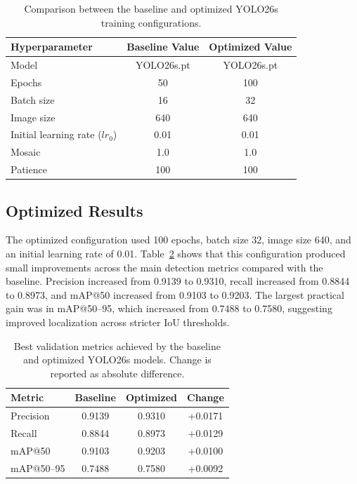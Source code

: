 \documentclass[10pt,twocolumn,letterpaper]{article}
\begin{document}
\begin{table}[!htbp]
  \centering
  \begin{tabular}{@{}lcc@{}}
    \toprule
    Hyperparameter & Baseline Value & Optimized Value \\
    \midrule
    Model & YOLO26s.pt & YOLO26s.pt \\
    Epochs & 50 & 100 \\
    Batch size & 16 & 32 \\
    Image size & 640 & 640 \\
    Initial learning rate ($lr_0$) & 0.01 & 0.01 \\
    Mosaic & 1.0 & 1.0 \\
    Patience & 100 & 100 \\
    \bottomrule
  \end{tabular}
  \caption{Comparison between the baseline and optimized YOLO26s training configurations.}
  \label{tab:config_comparison}
\end{table}

\subsection{Optimized Results}

The optimized configuration used 100 epochs, batch size 32, image size 640, and an initial learning rate of 0.01. Table~\ref{tab:metric_comparison} shows that this configuration produced small improvements across the main detection metrics compared with the baseline. Precision increased from 0.9139 to 0.9310, recall increased from 0.8844 to 0.8973, and mAP@50 increased from 0.9103 to 0.9203. The largest practical gain was in mAP@50--95, which increased from 0.7488 to 0.7580, suggesting improved localization across stricter IoU thresholds.

\begin{table}[!htbp]
  \centering
  \small
  \begin{tabular}{@{}lccc@{}}
    \toprule
    Metric & Baseline & Optimized & Change \\
    \midrule
    Precision & 0.9139 & 0.9310 & +0.0171 \\
    Recall & 0.8844 & 0.8973 & +0.0129 \\
    mAP@50 & 0.9103 & 0.9203 & +0.0100 \\
    mAP@50--95 & 0.7488 & 0.7580 & +0.0092 \\
    \bottomrule
  \end{tabular}
  \caption{Best validation metrics achieved by the baseline and optimized YOLO26s models. Change is reported as absolute difference.}
  \label{tab:metric_comparison}
\end{table}
\end{document}
